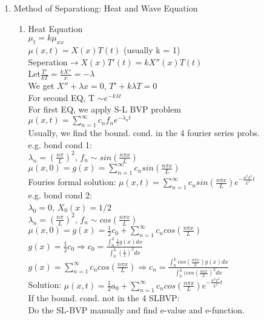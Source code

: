 \documentclass[10pt]{article}
\begin{document}
\begin{multicols}{2}
\begin{enumerate}
	\item Method of Separationg: Heat and Wave Equation 
		\begin{enumerate}
			\item Heat Equation\\
				$\mu_t = k\mu_{xx}$\\
				$\mu(x,t) = X(x)T(t)$ (usually k = 1)\\
				Seperation$\rightarrow X(x)T'(t) = kX''(x)T(t)$\\
				Let$\frac{T'}{kT} = \frac{kX''}{x} = -\lambda$\\
				We get $X'' + \lambda x = 0$, $T' + k\lambda T = 0$\\
				For second EQ, T $\sim e^{-k\lambda t}$\\
				For first EQ, we apply S-L BVP problem\\
				$\mu(x,t) = \sum_{n = 1}^{\infty}c_n f_n e^{-\lambda_n t}$\\
				Usually, we find the bound. cond. in the 4 fourier series probs.\\
				e.g. bond cond 1:\\
				$\lambda_n = (\frac{n \pi}{L})^2$, $f_n \sim sin(\frac{n \pi x}{L})$\\
				$\mu (x,0) = g(x) = \sum_{n = 1}^{\infty}c_n sin(\frac{n\pi x}{L})$\\
				Fouries formal solution: $\mu (x,t) = \sum_{n = 1}^{\infty}c_nsin(\frac{n \pi x}{L})e^{-\frac{n^2\pi^2}{L^2}t}$ \\
				e.g. bond cond 2:\\
				$\lambda_0 = 0$, $X_0(x) = 1/2$\\
				$\lambda_n = (\frac{n \pi}{L})^2$, $f_n \sim cos(\frac{n \pi x}{L})$\\
				$\mu (x,0) = g(x) = \frac{1}{2} c_0 + \sum_{n = 1}^{\infty}c_n cos(\frac{n\pi x}{L})$\\
				$g(x) = \frac{1}{2} c_0 \Rightarrow c_0 = \frac{\int_{0}^{L} \frac{1}{2} g(x)dx }{\int_{0}^{L} (\frac{1}{2})^2dx}$\\
				$g(x) = \sum_{n = 1}^{\infty}c_n cos(\frac{n\pi x}{L})\Rightarrow c_n = \frac{\int_{0}^{L} cos(\frac{n\pi x}{L}) g(x)dx }{\int_{0}^{L} (cos(\frac{n\pi x}{L})^2dx}$\\
				Solution: $\mu (x,t) = \frac{1}{2} a_0 + \sum_{n = 1}^{\infty}c_n cos(\frac{n \pi x}{L})e^{-\frac{n^2\pi^2}{L^2}t}$\\
				If the bound. cond. not in the 4 SLBVP:\\
				Do the SL-BVP manually and find e-value and e-function.\\

\end{enumerate}
\end{enumerate}
\end{multicols}
\end{document}
